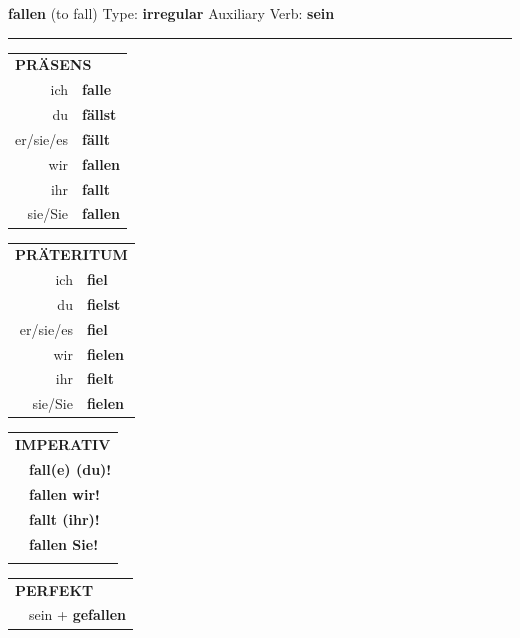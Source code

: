 \documentclass[10pt,a4paper]{revtex4-2}
\begin{document}
\begin{verbbox}
    {\Large \bf fallen} (to fall) \hfill Type: \textbf{irregular} \hfill Auxiliary Verb: \textbf{sein} 
    
     \vspace{5pt}

    \hrule
    
    \vspace{5pt}

  \begin{tabular}{rl}
     \multicolumn{2}{l}{\textbf{PRÄSENS} }\\
    ich & \textbf{falle}\\
    du & \textbf{fällst}\\
    er/sie/es & \textbf{fällt}\\
    wir & \textbf{fallen}\\
    ihr & \textbf{fallt}\\
    sie/Sie & \textbf{fallen}\\
  \end{tabular}
  \hfill
     \begin{tabular}{rl}
    \multicolumn{2}{l}{\textbf{PRÄTERITUM} }\\
    ich & \textbf{fiel}\\
    du & \textbf{fielst}\\
    er/sie/es & \textbf{fiel}\\
    wir & \textbf{fielen}\\
    ihr & \textbf{fielt}\\
    sie/Sie & \textbf{fielen}\\
  \end{tabular}
  \hfill
  \begin{tabular}{rl}
     \multicolumn{2}{l}{\textbf{IMPERATIV} }\\
   & \textbf{fall(e) (du)!}\\
   & \textbf{fallen wir!}\\
   & \textbf{fallt (ihr)!}\\
   & \textbf{fallen Sie!}\\
   & \vspace{10pt}
  \end{tabular}

    \vspace{10pt}

 \begin{tabular}{rl}
     \multicolumn{2}{l}{\textbf{PERFEKT}}\\
    & sein + \textbf{gefallen}\\
  \end{tabular}
\hfill
   \begin{tabular}{rl}
   

\end{tabular}
\end{verbbox}
\end{document}
